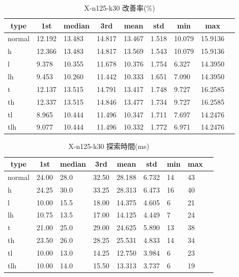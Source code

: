 \begin{table}[htbp]
    \caption{X-n125-k30 改善率(\%)}
    \begin{tabular}{|l|l|l|l|l|l|l|l|l|}\hline
    \multicolumn{1}{|c|}{\textbf{type}}
    &\multicolumn{1}{|c|}{\textbf{1st}}
    &\multicolumn{1}{c|}{\textbf{median}}
    &\multicolumn{1}{c|}{\textbf{3rd}}
    &\multicolumn{1}{c|}{\textbf{mean}}
    &\multicolumn{1}{c|}{\textbf{std}}
    &\multicolumn{1}{c|}{\textbf{min}}
    &\multicolumn{1}{c|}{\textbf{max}}\\\hline
	normal & 12.192 & 13.483 & 14.817 & 13.467 & 1.518 & 10.079 & 15.9136\\\hline
	h & 12.366 & 13.483 & 14.817 & 13.569 & 1.543 & 10.079 & 15.9136\\\hline
	l & 9.378 & 10.355 & 11.678 & 10.376 & 1.754 & 6.327 & 14.3950\\\hline
	lh & 9.453 & 10.260 & 11.442 & 10.333 & 1.651 & 7.090 & 14.3950\\\hline
	t & 12.137 & 13.515 & 14.791 & 13.417 & 1.748 & 9.727 & 16.2585\\\hline
	th & 12.337 & 13.515 & 14.846 & 13.477 & 1.734 & 9.727 & 16.2585\\\hline
	tl & 8.965 & 10.444 & 11.496 & 10.347 & 1.711 & 7.697 & 14.2476\\\hline
	tlh & 9.077 & 10.444 & 11.496 & 10.332 & 1.772 & 6.971 & 14.2476\\\hline
	\end{tabular}
\end{table}
\begin{table}[htbp]
    \caption{X-n125-k30 探索時間(ms)}
    \begin{tabular}{|l|l|l|l|l|l|l|l|l|}\hline
    \multicolumn{1}{|c|}{\textbf{type}}
    &\multicolumn{1}{|c|}{\textbf{1st}}
    &\multicolumn{1}{c|}{\textbf{median}}
    &\multicolumn{1}{c|}{\textbf{3rd}}
    &\multicolumn{1}{c|}{\textbf{mean}}
    &\multicolumn{1}{c|}{\textbf{std}}
    &\multicolumn{1}{c|}{\textbf{min}}
    &\multicolumn{1}{c|}{\textbf{max}}\\\hline
	normal & 24.00 & 28.0 & 32.50 & 28.188 & 6.732 & 14 & 43\\\hline
	h & 24.25 & 30.0 & 33.25 & 28.313 & 6.473 & 16 & 40\\\hline
	l & 10.00 & 15.5 & 18.00 & 14.375 & 4.605 & 6 & 21\\\hline
	lh & 10.75 & 13.5 & 17.00 & 14.125 & 4.449 & 7 & 24\\\hline
	t & 21.00 & 25.0 & 29.00 & 24.625 & 5.890 & 13 & 38\\\hline
	th & 23.50 & 26.0 & 28.25 & 25.531 & 4.833 & 14 & 34\\\hline
	tl & 10.00 & 13.0 & 14.25 & 12.750 & 3.984 & 6 & 23\\\hline
	tlh & 10.00 & 14.0 & 15.50 & 13.313 & 3.737 & 6 & 19\\\hline
	\end{tabular}
\end{table}
